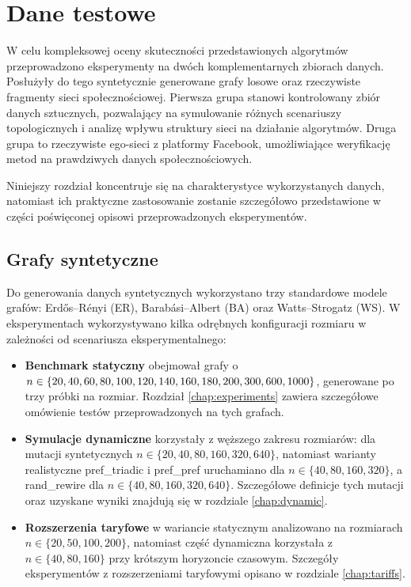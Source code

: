 \chapter{Dane testowe}\label{chap:testdata}

W celu kompleksowej oceny skuteczności przedstawionych algorytmów przeprowadzono eksperymenty na dwóch komplementarnych zbiorach danych. Posłużyły do tego syntetycznie generowane grafy losowe oraz rzeczywiste fragmenty sieci społecznościowej. Pierwsza grupa stanowi kontrolowany zbiór danych sztucznych, pozwalający na symulowanie różnych scenariuszy topologicznych i analizę wpływu struktury sieci na działanie algorytmów. Druga grupa to rzeczywiste ego-sieci z platformy Facebook, umożliwiające weryfikację metod na prawdziwych danych społecznościowych.

Niniejszy rozdział koncentruje się na charakterystyce wykorzystanych danych, natomiast ich praktyczne zastosowanie zostanie szczegółowo przedstawione w części poświęconej opisowi przeprowadzonych eksperymentów.

\section{Grafy syntetyczne}

Do generowania danych syntetycznych wykorzystano trzy standardowe modele grafów: Erd\H{o}s--Rényi (ER), Barabási--Albert (BA) oraz Watts--Strogatz (WS).
W eksperymentach wykorzystywano kilka odrębnych konfiguracji rozmiaru w zależności od scenariusza eksperymentalnego:
\begin{itemize}
  \item \textbf{Benchmark statyczny} obejmował grafy o $n \in \{20, 40, 60, 80, 100, 120, 140, 160, 180,\\200, 300, 600, 1000\}$, generowane po trzy próbki na rozmiar. Rozdział \ref{chap:experiments} zawiera szczegółowe omówienie testów przeprowadzonych na tych grafach.
  \item \textbf{Symulacje dynamiczne} korzystały z węższego zakresu rozmiarów: dla mutacji syntetycznych $n \in \{20, 40, 80, 160, 320, 640\}$, natomiast warianty realistyczne pref\_triadic i pref\_pref uruchamiano dla $n\in\{40,80,160,320\}$, a rand\_rewire dla $n\in\{40,80,160,320,640\}$. Szczegółowe definicje tych mutacji oraz uzyskane wyniki znajdują się w rozdziale \ref{chap:dynamic}.
  \item \textbf{Rozszerzenia taryfowe} w wariancie statycznym analizowano na rozmiarach $n \in \{20, 50, 100, 200\}$, natomiast część dynamiczna korzystała z $n \in \{40, 80, 160\}$ przy krótszym horyzoncie czasowym. Szczegóły eksperymentów z rozszerzeniami taryfowymi opisano w rozdziale \ref{chap:tariffs}.
\end{itemize}

